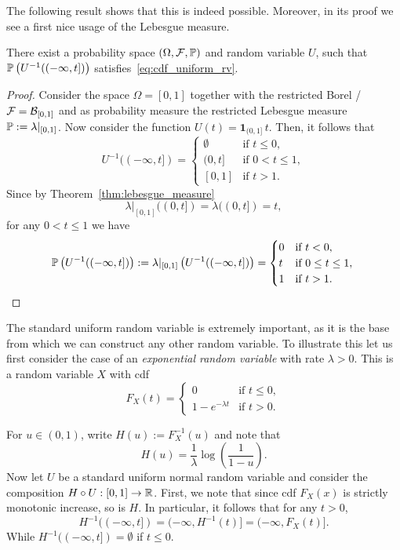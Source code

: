 The following result shows that this is indeed possible. Moreover, in its proof we see a first nice usage of the Lebesgue measure.

\begin{proposition}\label{prop:uniform_random_variable}
There exist a probability space $(\Omega,\mathcal F, \mathbb P)$ and random variable $U$, such that $\mathbb P\left(U^{-1}((-\infty,t])\right)$ satisfies~\eqref{eq:cdf_uniform_rv}.
\end{proposition}

\begin{proof}
Consider the space $\Omega = [0,1]$ together with the restricted Borel \sigalg/ $\mathcal F = \mathcal B_{[0,1]}$ and as probability measure the restricted Lebesgue measure $\mathbb P := \lambda|_{[0,1]}$. Now consider the function $U(t) = \mathbf{1}_{(0,1]} \, t$. Then, it follows that
\[
	U^{-1}((-\infty,t]) = \begin{cases}
		\emptyset &\text{if } t \le 0,\\
		(0,t] &\text{if } 0 < t \le 1, \\
		[0,1] &\text{if } t > 1.
	\end{cases}
\]
Since by Theorem~\ref{thm:lebesgue_measure}
\[
	\lambda|_{[0,1]}((0,t]) = \lambda((0,t]) = t,
\]
for any $0 < t \le 1$ we have
\[
	\mathbb P\left(U^{-1}((-\infty,t])\right) := \lambda|_{[0,1]}\left(U^{-1}((-\infty,t])\right)
	= \begin{cases}
		0 &\text{if } t < 0,\\
		t &\text{if } 0 \le t\le 1,\\
		1 &\text{if } t > 1.
	\end{cases}\qedhere
\]
\end{proof}

The standard uniform random variable is extremely important, as it is the base from which we can construct any other random variable. To illustrate this let us first consider the case of an \emph{exponential random variable} with rate $\lambda > 0$. This is a random variable $X$ with cdf
\[
	F_X(t) = \begin{cases}
		0 &\text{if } t \le 0,\\
		1-e^{-\lambda t} &\text{if } t > 0.
	\end{cases}
\]

For $u \in (0,1)$, write $H(u) := F_X^{-1}(u)$ and note that
\[
	H(u) = \frac{1}{\lambda} \log\left(\frac{1}{1-u}\right).
\]
Now let $U$ be a standard uniform normal random variable and consider the composition $H \circ U : [0,1] \to \mathbb R$. First, we note that since cdf $F_X(x)$ is strictly monotonic increase, so is $H$. In particular, it follows that for any $t > 0$,
\[
	H^{-1}((-\infty,t]) = (-\infty, H^{-1}(t)] = (-\infty, F_X(t)].
\]
While $H^{-1}((-\infty,t]) = \emptyset$ if $t \le 0$.

